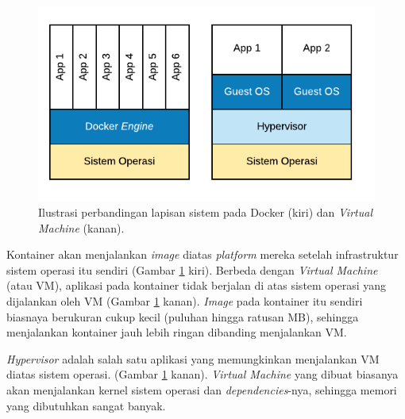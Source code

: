     \begin{figure}[H]
        \centering
        \includegraphics{Gambar/illust-docker.pdf}
        \caption{Ilustrasi perbandingan lapisan sistem pada Docker (kiri) dan
        \textit{Virtual Machine} (kanan).}
        \label{fig:illust-docker}
    \end{figure}
    
    Kontainer akan menjalankan \textit{image} diatas \textit{platform} mereka
    setelah infrastruktur sistem operasi itu sendiri (Gambar
    \ref{fig:illust-docker} kiri). Berbeda dengan \textit{Virtual Machine} (atau
    VM), aplikasi pada kontainer tidak berjalan di atas sistem operasi yang
    dijalankan oleh VM (Gambar \ref{fig:illust-docker} kanan). \textit{Image}
    pada kontainer itu sendiri biasnaya berukuran cukup kecil (puluhan hingga
    ratusan MB), sehingga menjalankan kontainer jauh lebih ringan dibanding
    menjalankan VM.
    
    \textit{Hypervisor} adalah salah satu aplikasi yang memungkinkan menjalankan
    VM diatas sistem operasi. (Gambar \ref{fig:illust-docker} kanan).
    \textit{Virtual Machine} yang dibuat biasanya akan menjalankan kernel sistem
    operasi dan \textit{dependencies}-nya, sehingga memori yang dibutuhkan
    sangat banyak.
    
